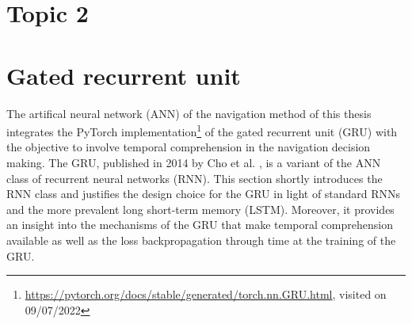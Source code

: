 \section{Topic 2}

\section{Gated recurrent unit}
The artifical neural network (ANN) of the navigation method of this thesis
integrates the PyTorch implementation\footnote{
    \url{https://pytorch.org/docs/stable/generated/torch.nn.GRU.html}, visited on 09/07/2022
}
of the gated recurrent unit (GRU)
with the objective to involve temporal comprehension in
the navigation decision making.
The GRU,
published in 2014 by Cho et al. \cite{Cho2014},
is a variant of the ANN class of recurrent neural networks (RNN).
This section shortly introduces the RNN class
and justifies the design choice for the GRU
in light of standard RNNs and the more prevalent long short-term memory (LSTM).
Moreover, it provides an insight into
the mechanisms of the GRU that make temporal comprehension available
as well as the loss backpropagation through time at the training of the GRU.

